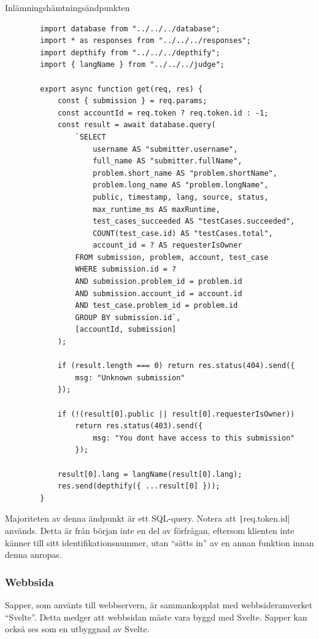 \documentclass{article}
\begin{document}
\begin{listing}[H]
	\caption{Inlämningshämtningsändpunkten}
	\begin{verbatim}
		import database from "../../../database";
		import * as responses from "../../../responses";
		import depthify from "../../../depthify";
		import { langName } from "../../../judge";

		export async function get(req, res) {
			const { submission } = req.params;
			const accountId = req.token ? req.token.id : -1;
			const result = await database.query(
				`SELECT
					username AS "submitter.username",
					full_name AS "submitter.fullName",
					problem.short_name AS "problem.shortName",
					problem.long_name AS "problem.longName",
					public, timestamp, lang, source, status,
					max_runtime_ms AS maxRuntime,
					test_cases_succeeded AS "testCases.succeeded",
					COUNT(test_case.id) AS "testCases.total",
					account_id = ? AS requesterIsOwner
				FROM submission, problem, account, test_case
				WHERE submission.id = ?
				AND submission.problem_id = problem.id
				AND submission.account_id = account.id
				AND test_case.problem_id = problem.id
				GROUP BY submission.id`,
				[accountId, submission]
			);

			if (result.length === 0) return res.status(404).send({
				msg: "Unknown submission"
			});

			if (!(result[0].public || result[0].requesterIsOwner))
				return res.status(403).send({
					msg: "You dont have access to this submission"
				});

			result[0].lang = langName(result[0].lang);
			res.send(depthify({ ...result[0] }));
		}
	\end{verbatim}
\end{listing}

Majoriteten av denna ändpunkt är ett SQL-query. Notera att
\texttt|req.token.id| används. Detta är från början inte
en del av förfrågan, eftersom klienten inte känner till sitt
identifikationsnummer, utan ``sätts in'' av en annan funktion innan denna
anropas.

\subsubsection{Webbsida}

Sapper, som använts till webbservern, är sammankopplat med webbsideramverket
``Svelte''. Detta medger att webbsidan måste vara byggd med Svelte. Sapper kan
också ses som en utbyggnad av Svelte.
\end{document}
